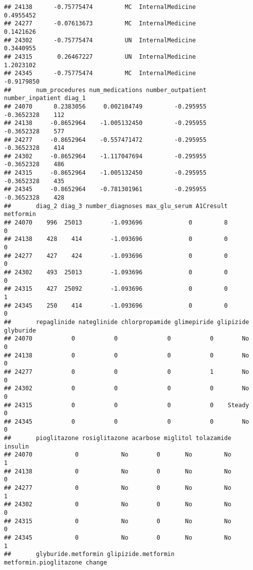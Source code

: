 \documentclass[
]{article}
\begin{document}
\begin{verbatim}
## 24138      -0.75775474         MC  InternalMedicine          0.4955452
## 24277      -0.07613673         MC  InternalMedicine          0.1421626
## 24302      -0.75775474         UN  InternalMedicine          0.3440955
## 24315       0.26467227         UN  InternalMedicine          1.2023102
## 24345      -0.75775474         MC  InternalMedicine         -0.9179850
##       num_procedures num_medications number_outpatient number_inpatient diag_1
## 24070      0.2383056     0.002104749         -0.295955       -0.3652328    112
## 24138     -0.8652964    -1.005132450         -0.295955       -0.3652328    577
## 24277     -0.8652964    -0.557471472         -0.295955       -0.3652328    414
## 24302     -0.8652964    -1.117047694         -0.295955       -0.3652328    486
## 24315     -0.8652964    -1.005132450         -0.295955       -0.3652328    435
## 24345     -0.8652964    -0.781301961         -0.295955       -0.3652328    428
##       diag_2 diag_3 number_diagnoses max_glu_serum A1Cresult metformin
## 24070    996  25013        -1.093696             0         8         0
## 24138    428    414        -1.093696             0         0         0
## 24277    427    424        -1.093696             0         0         0
## 24302    493  25013        -1.093696             0         0         0
## 24315    427  25092        -1.093696             0         0         1
## 24345    250    414        -1.093696             0         0         0
##       repaglinide nateglinide chlorpropamide glimepiride glipizide glyburide
## 24070           0           0              0           0        No         0
## 24138           0           0              0           0        No         0
## 24277           0           0              0           1        No         0
## 24302           0           0              0           0        No         0
## 24315           0           0              0           0    Steady         0
## 24345           0           0              0           0        No         0
##       pioglitazone rosiglitazone acarbose miglitol tolazamide insulin
## 24070            0            No        0       No         No       1
## 24138            0            No        0       No         No       0
## 24277            0            No        0       No         No       1
## 24302            0            No        0       No         No       0
## 24315            0            No        0       No         No       0
## 24345            0            No        0       No         No       1
##       glyburide.metformin glipizide.metformin metformin.pioglitazone change

\end{verbatim}
\end{document}

